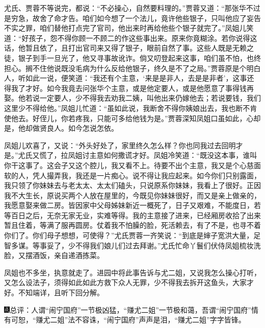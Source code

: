 尤氏、贾蓉不等说完，都说：``不必操心，自然要料理的。''贾蓉又道：``那张华不过是穷急，故舍了命才告。咱们如今想了一个法儿，竟许他些银子，只叫他应了妄告不实之罪，咱们替他打点完了官司，他出来时再给他些个银子就完了。''凤姐儿笑道：``好孩子，怨不得你顾一不顾二的作这些事出来。原来你竟糊涂。若你说得这话，他暂且依了，且打出官司来又得了银子，眼前自然了事。这些人既是无赖之徒，银子到手一旦光了，他又寻事故讹诈。倘又叨登起来这事，咱们虽不怕，也终担心。搁不住他说既没毛病为什么反给他银子，终久是不了之局。''贾蓉原是个明白人，听如此一说，便笑道：``我还有个主意，`来是是非人，去是是非者'，这事还得我了才好。如今我竟去问张华个主意，或是他定要人，或是他愿意了事得钱再娶。他若说一定要人，少不得我去劝我二姨，叫他出来仍嫁他去；若说要钱，我们这里少不得给他。''凤姐儿忙道：``虽如此说，我断舍不得你姨娘出去，我也断不肯使他去。好侄儿，你若疼我，只能可多给他钱为是。''贾蓉深知凤姐口虽如此，心却是，他却做贤良人。如今怎说怎依。

凤姐儿欢喜了，又说：``外头好处了，家里终久怎么样？你也同我过去回明才是。''尤氏又慌了，拉凤姐讨主意如何撒谎才好。凤姐冷笑道：``既没这本事，谁叫你干这事了。这会子又这个腔儿，我又看不上。待要不出个主意，我又是个心慈面软的人，凭人撮弄我，我还是一片痴心。说不得让我应起来。如今你们只别露面，我只领了你妹妹去与老太太、太太们磕头，只说原系你妹妹，我看上了很好。正因我不大生长，原说买两个人放在屋里的，今既见你妹妹很好，而又是亲上做亲的，我愿意娶来做二房。皆因家中父母姊妹新近一概死了，日子又艰难，不能度日，若等百日之后，无奈无家无业，实难等得。我的主意接了进来，已经厢房收拾了出来暂且住着，等满了服再圆房。仗着我不怕臊的脸，死活赖去，有了不是，也寻不着你们了。你们母子想想，可使得？''尤氏贾蓉一齐笑说：``到底是婶子宽洪大量，足智多谋。等事妥了，少不得我们娘儿们过去拜谢。''尤氏忙命丫鬟们伏侍凤姐梳妆洗脸，又摆酒饭，亲自递酒拣菜。

凤姐也不多坐，执意就走了。进园中将此事告诉与尤二姐，又说我怎么操心打听，又怎么设法子，须得如此如此方救下众人无罪，少不得我去拆开这鱼头，大家才好。不知端详，且听下回分解。

{\includegraphics[width=3mm]{../Images/00005}\kaishu 总评：人谓``闹宁国府''一节极凶猛，``赚尤二姐''一节极和蔼，吾谓``闹宁国府''情有可恕，``赚尤二姐''法不容诛，``闹宁国府''声声是泪，``赚尤二姐''字字皆锋。}
